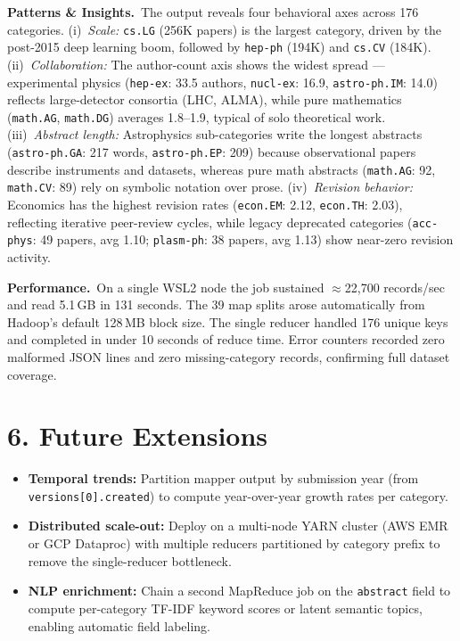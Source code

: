 \documentclass[11pt,a4paper]{article}
\begin{document}
\textbf{Patterns \& Insights.}~The output reveals four behavioral axes across 176 categories. (i)~\textit{Scale:} \texttt{cs.LG} (256K papers) is the largest category, driven by the post-2015 deep learning boom, followed by \texttt{hep-ph} (194K) and \texttt{cs.CV} (184K). (ii)~\textit{Collaboration:} The author-count axis shows the widest spread --- experimental physics (\texttt{hep-ex}: 33.5 authors, \texttt{nucl-ex}: 16.9, \texttt{astro-ph.IM}: 14.0) reflects large-detector consortia (LHC, ALMA), while pure mathematics (\texttt{math.AG}, \texttt{math.DG}) averages 1.8--1.9, typical of solo theoretical work. (iii)~\textit{Abstract length:} Astrophysics sub-categories write the longest abstracts (\texttt{astro-ph.GA}: 217 words, \texttt{astro-ph.EP}: 209) because observational papers describe instruments and datasets, whereas pure math abstracts (\texttt{math.AG}: 92, \texttt{math.CV}: 89) rely on symbolic notation over prose. (iv)~\textit{Revision behavior:} Economics has the highest revision rates (\texttt{econ.EM}: 2.12, \texttt{econ.TH}: 2.03), reflecting iterative peer-review cycles, while legacy deprecated categories (\texttt{acc-phys}: 49 papers, avg 1.10; \texttt{plasm-ph}: 38 papers, avg 1.13) show near-zero revision activity.

\textbf{Performance.}~On a single WSL2 node the job sustained $\approx$22,700 records/sec and read 5.1\,GB in 131 seconds. The 39 map splits arose automatically from Hadoop's default 128\,MB block size. The single reducer handled 176 unique keys and completed in under 10 seconds of reduce time. Error counters recorded zero malformed JSON lines and zero missing-category records, confirming full dataset coverage.

\section*{6. Future Extensions}
\begin{itemize}
  \item \textbf{Temporal trends:} Partition mapper output by submission year (from \texttt{versions[0].created}) to compute year-over-year growth rates per category.
  \item \textbf{Distributed scale-out:} Deploy on a multi-node YARN cluster (AWS EMR or GCP Dataproc) with multiple reducers partitioned by category prefix to remove the single-reducer bottleneck.
  \item \textbf{NLP enrichment:} Chain a second MapReduce job on the \texttt{abstract} field to compute per-category TF-IDF keyword scores or latent semantic topics, enabling automatic field labeling.
\end{itemize}
\end{document}
